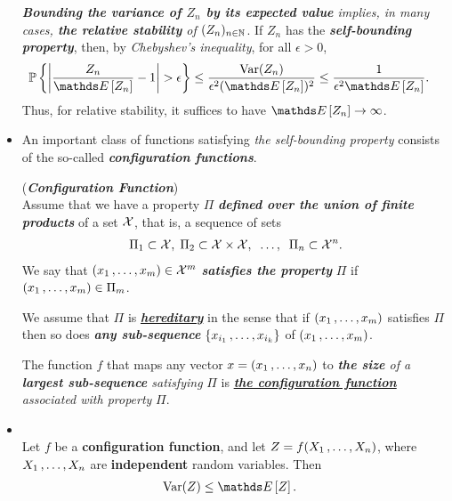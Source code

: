 \documentclass[11pt]{article}
\begin{document}
\begin{itemize}
\begin{remark}
\emph{\textbf{Bounding the variance of $Z_n$ by its expected value} implies, in many cases, \textbf{the relative stability} of $(Z_n)_{n\in {\mathbb N}}$}. If $Z_n$ has the
\emph{\textbf{self-bounding property}}, then, by \emph{Chebyshev's inequality}, for all $\epsilon > 0$,
\begin{align*}
\bP\set{\abs{\frac{Z_n}{\E{}{Z_n}} - 1} > \epsilon} &\le \frac{\text{Var}(Z_n)}{\epsilon^2 (\E{}{Z_n})^2} \le \frac{1}{\epsilon^2 \E{}{Z_n}}.
\end{align*}
Thus, for relative stability, it suffices to have $\E{}{Z_n} \to \infty$.
\end{remark}

\item An important class of functions satisfying \emph{the self-bounding property} consists of the so-called \emph{\textbf{configuration functions}}.
\begin{definition} (\emph{\textbf{Configuration Function}})\\
Assume that we have a property $\Pi$ \emph{\textbf{defined over the union of finite products}} of a set ${\mathcal X}$, that is, a sequence of sets 
\begin{align*}
\Pi_1 \subset {\mathcal X},\;  \Pi_2 \subset {\mathcal X} \times {\mathcal X}, \;\;\ldots,\;\; \Pi_n \subset {\mathcal X}^n.
\end{align*} We say that $(x_1 \,{,}\ldots{,}\, x_m) \in {\mathcal X}^m$ \emph{\textbf{satisfies the property}} $\Pi$ if $(x_1 \,{,}\ldots{,}\, x_m) \in \Pi_m$. 

We assume that $\Pi$ is \underline{\emph{\textbf{hereditary}}} in the sense that if $(x_1 \,{,}\ldots{,}\, x_m)$ satisfies $\Pi$ then so does \emph{\textbf{any sub-sequence}} $\left\{x_{i_1} \,{,}\ldots{,}\, x_{i_k}\right\}$ of $(x_1 \,{,}\ldots{,}\, x_m)$. 

The function $f$ that maps any vector $x = (x_1 \,{,}\ldots{,}\, x_n)$  to \emph{\textbf{the size} of a \textbf{largest sub-sequence} satisfying} $\Pi$ is \underline{\emph{\textbf{the configuration function}}} \emph{associated with property} $\Pi$.
\end{definition}

\item \begin{corollary} \citep{boucheron2013concentration}\\
Let $f$ be a \textbf{configuration function}, and let $Z = f(X_1 \,{,}\ldots{,}\, X_n)$, where $X_1 \,{,}\ldots{,}\, X_n$ are \textbf{independent} random variables. Then
\begin{align*}
\text{Var}(Z) &\le \E{}{Z}.
\end{align*}
\end{corollary}


\end{itemize}
\end{document}

